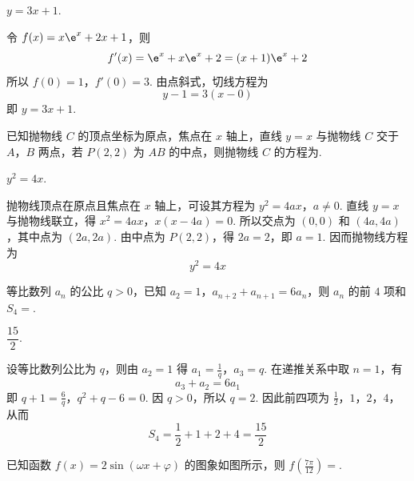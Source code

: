 \begin{answer}
\(y=3x+1\).
\end{answer}

\begin{solution}
令 \(f(x)=x\e^{x}+2x+1\)，则
\[
f'(x)=\e^{x}+x\e^{x}+2=(x+1)\e^{x}+2
\]
所以 \(f(0)=1\)，\(f'(0)=3\). 由点斜式，切线方程为
\[
y-1=3(x-0)
\]
即 \(y=3x+1\).
\end{solution}

\begin{problem}
已知抛物线 \(C\) 的顶点坐标为原点，焦点在 \(x\) 轴上，直线 \(y = x\) 与抛物线 \(C\) 交于 \(A\)，\(B\) 两点，若 \(P(2, 2)\) 为 \(AB\) 的中点，则抛物线 \(C\) 的方程为\fillinblank{}.
\end{problem}

\begin{answer}
\(y^{2}=4x\).
\end{answer}

\begin{solution}
抛物线顶点在原点且焦点在 \(x\) 轴上，可设其方程为
\(y^{2}=4ax\)，\(a\ne0\).
直线 \(y=x\) 与抛物线联立，得
\(x^{2}=4ax\)，\(x(x-4a)=0\).
所以交点为 \((0,0)\) 和 \((4a,4a)\)，其中点为 \((2a,2a)\). 由中点为 \(P(2,2)\)，得 \(2a=2\)，即 \(a=1\). 因而抛物线方程为
\[
y^{2}=4x
\]
\end{solution}

\begin{problem}
等比数列 \(a_{n}\) 的公比 \(q > 0\)，已知 \(a_{2} = 1\)，\(a_{n+2} + a_{n+1} = 6a_{n}\)，则 \(a_{n}\) 的前 \(4\) 项和 \(S_{4} =\)\fillinblank{}.
\end{problem}

\begin{answer}
\(\dfrac{15}{2}\).
\end{answer}

\begin{solution}
设等比数列公比为 \(q\)，则由 \(a_{2}=1\) 得
\(a_{1}=\frac1q\)，\(a_{3}=q\).
在递推关系中取 \(n=1\)，有
\[
a_{3}+a_{2}=6a_{1}
\]
即
\(q+1=\frac6q\)，\(q^{2}+q-6=0\).
因 \(q>0\)，所以 \(q=2\). 因此前四项为
\(\frac12\)，\(1\)，\(2\)，\(4\)，
从而
\[
S_{4}=\frac12+1+2+4=\frac{15}{2}
\]
\end{solution}

\begin{problem}
已知函数 \( f(x)=2\sin(\omega x+\varphi) \) 的图象如图所示，则 \( f\left(\frac{7\pi}{12}\right)= \)\fillinblank{}.

\end{problem}

